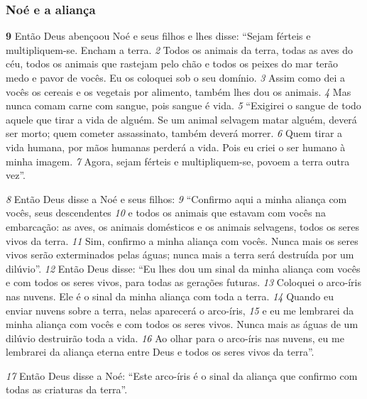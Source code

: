 \bigskip
\subsubsection*{Noé e a aliança}


\textbf{\large 9}
 Então Deus abençoou Noé e seus filhos e lhes disse: “Sejam férteis e multipliquem-se. Encham a terra. 
\textit{\tiny 2}
 Todos os animais da terra, todas as aves do céu, todos os animais que rastejam pelo chão e todos os peixes do mar terão medo e pavor de vocês. Eu os coloquei sob o seu domínio. 
\textit{\tiny 3}
 Assim como dei a vocês os cereais e os vegetais por alimento, também lhes dou os animais. 
\textit{\tiny 4}
 Mas nunca comam carne com sangue, pois sangue é vida. 
\textit{\tiny 5}
 “Exigirei o sangue de todo aquele que tirar a vida de alguém. Se um animal selvagem matar alguém, deverá ser morto; quem cometer assassinato, também deverá morrer. 
\textit{\tiny 6}
 Quem tirar a vida humana, por mãos humanas perderá a vida. Pois eu criei o ser humano à minha imagem. 
\textit{\tiny 7}
 Agora, sejam férteis e multipliquem-se, povoem a terra outra vez”.



\bigskip
\textit{\tiny 8}
 Então Deus disse a Noé e seus filhos: 
\textit{\tiny 9}
 “Confirmo aqui a minha aliança com vocês, seus descendentes 
\textit{\tiny 10}
 e todos os animais que estavam com vocês na embarcação: as aves, os animais domésticos e os animais selvagens, todos os seres vivos da terra. 
\textit{\tiny 11}
 Sim, confirmo a minha aliança com vocês. Nunca mais os seres vivos serão exterminados pelas águas; nunca mais a terra será destruída por um dilúvio”. 
\textit{\tiny 12}
 Então Deus disse: “Eu lhes dou um sinal da minha aliança com vocês e com todos os seres vivos, para todas as gerações futuras. 
\textit{\tiny 13}
 Coloquei o arco-íris nas nuvens. Ele é o sinal da minha aliança com toda a terra. 
\textit{\tiny 14}
 Quando eu enviar nuvens sobre a terra, nelas aparecerá o arco-íris, 
\textit{\tiny 15}
 e eu me lembrarei da minha aliança com vocês e com todos os seres vivos. Nunca mais as águas de um dilúvio destruirão toda a vida. 
\textit{\tiny 16}
 Ao olhar para o arco-íris nas nuvens, eu me lembrarei da aliança eterna entre Deus e todos os seres vivos da terra”.



\bigskip
\textit{\tiny 17}
 Então Deus disse a Noé: “Este arco-íris é o sinal da aliança que confirmo com todas as criaturas da terra”.



